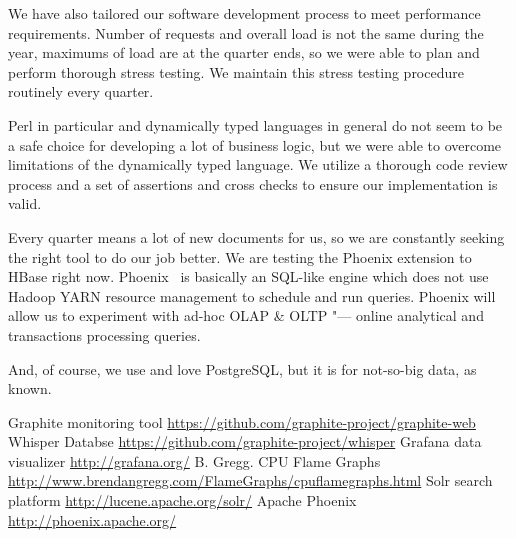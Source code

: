 \documentclass[10pt, a5paper]{article}
\begin{document}
We have also tailored our software development process to meet performance requirements. Number of requests and overall load is not the same during the year, maximums of load are at the quarter ends, so we were able to plan and perform thorough stress testing. We maintain this stress testing procedure routinely every quarter.

Perl in particular and dynamically typed languages in general do not seem to be a safe choice for developing a lot of business logic, but we were able to overcome limitations of the dynamically typed language. We utilize a thorough code review process and a set of assertions and cross checks to ensure our implementation is valid.

Every quarter means a lot of new documents for us, so we are constantly seeking the right tool to do our job better. We are testing the Phoenix extension to HBase right now. Phoenix~\cite{Chistyakov6} is basically an SQL-like engine which does not use Hadoop YARN resource management to schedule and run queries. Phoenix will allow us to experiment with ad-hoc OLAP \& OLTP "--- online analytical and transactions processing queries.

And, of course, we use and love PostgreSQL, but it is for not-so-big data, as known.

\begin{thebibliography}{99}
 Graphite monitoring tool \url{https://github.com/graphite-project/graphite-web}
 Whisper Databse \url{https://github.com/graphite-project/whisper}
 Grafana data visualizer \url{http://grafana.org/}
 B. Gregg. CPU Flame Graphs \url{http://www.brendangregg.com/FlameGraphs/cpuflamegraphs.html}
 Solr search platform \url{http://lucene.apache.org/solr/}
 Apache Phoenix \url{http://phoenix.apache.org/}
\end{thebibliography}
\end{document}
